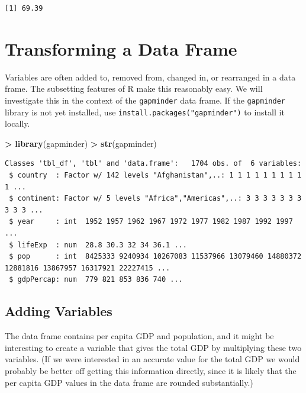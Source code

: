 \documentclass[]{krantz}
\makeatletter
\newenvironment{Shaded}{\begin{snugshade}}{\end{snugshade}}
\newcommand{\KeywordTok}[1]{\textcolor[rgb]{0.27,0.27,0.27}{\textbf{#1}}}
\newcommand{\StringTok}[1]{\textcolor[rgb]{0.5,0.5,0.5}{#1}}
\newcommand{\OperatorTok}[1]{\textcolor[rgb]{0.43,0.43,0.43}{\textbf{#1}}}
\newcommand{\NormalTok}[1]{#1}
\newenvironment{kframe}{%
\medskip{}
\setlength{\fboxsep}{.8em}
 \def\at@end@of@kframe{}%
 \ifinner\ifhmode%
  \def\at@end@of@kframe{\end{minipage}}%
  \begin{minipage}{\columnwidth}%
 \fi\fi%
 \def\FrameCommand##1{\hskip\@totalleftmargin \hskip-\fboxsep
 \colorbox{shadecolor}{##1}\hskip-\fboxsep
     \hskip-\linewidth \hskip-\@totalleftmargin \hskip\columnwidth}%
 \MakeFramed {\advance\hsize-\width
   \@totalleftmargin\z@ \linewidth\hsize
   \@setminipage}}%
 {\par\unskip\endMakeFramed%
 \at@end@of@kframe}
\renewenvironment{Shaded}{\begin{kframe}}{\end{kframe}}
\makeatother
\begin{document}
\begin{verbatim}
[1] 69.39
\end{verbatim}

\section{Transforming a Data Frame}\label{transforming-a-data-frame}

Variables are often added to, removed from, changed in, or rearranged in
a data frame. The subsetting features of R make this reasonably easy. We
will investigate this in the context of the \texttt{gapminder} data
frame. If the \texttt{gapminder} library is not yet installed, use
\texttt{install.packages("gapminder")} to install it locally.

\begin{Shaded}
\begin{Highlighting}[]
\OperatorTok{>}\StringTok{ }\KeywordTok{library}\NormalTok{(gapminder)}
\OperatorTok{>}\StringTok{ }\KeywordTok{str}\NormalTok{(gapminder)}
\end{Highlighting}
\end{Shaded}

\begin{verbatim}
Classes 'tbl_df', 'tbl' and 'data.frame':   1704 obs. of  6 variables:
 $ country  : Factor w/ 142 levels "Afghanistan",..: 1 1 1 1 1 1 1 1 1 1 ...
 $ continent: Factor w/ 5 levels "Africa","Americas",..: 3 3 3 3 3 3 3 3 3 3 ...
 $ year     : int  1952 1957 1962 1967 1972 1977 1982 1987 1992 1997 ...
 $ lifeExp  : num  28.8 30.3 32 34 36.1 ...
 $ pop      : int  8425333 9240934 10267083 11537966 13079460 14880372 12881816 13867957 16317921 22227415 ...
 $ gdpPercap: num  779 821 853 836 740 ...
\end{verbatim}

\subsection{Adding Variables}\label{adding-variables}

The data frame contains per capita GDP and population, and it might be
interesting to create a variable that gives the total GDP by multiplying
these two variables. (If we were interested in an accurate value for the
total GDP we would probably be better off getting this information
directly, since it is likely that the per capita GDP values in the data
frame are rounded substantially.)

\begin{Shaded}
\end{Shaded}
\end{document}
